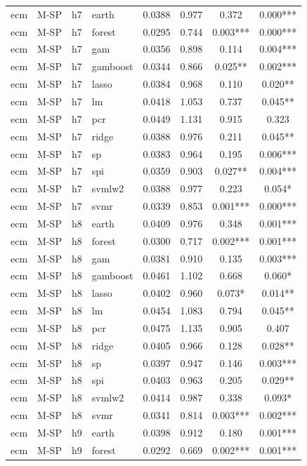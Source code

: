 \begin{ThreePartTable}
\begin{longtable}[t]{llclcccc}
\addlinespace
ecm & M-SP & h7 & earth & 0.0388 & 0.977 & 0.372 & 0.000***\\
ecm & M-SP & h7 & forest & 0.0295 & 0.744 & 0.003*** & 0.000***\\
ecm & M-SP & h7 & gam & 0.0356 & 0.898 & 0.114 & 0.004***\\
ecm & M-SP & h7 & gamboost & 0.0344 & 0.866 & 0.025** & 0.002***\\
ecm & M-SP & h7 & lasso & 0.0384 & 0.968 & 0.110 & 0.020**\\
ecm & M-SP & h7 & lm & 0.0418 & 1.053 & 0.737 & 0.045**\\
ecm & M-SP & h7 & pcr & 0.0449 & 1.131 & 0.915 & 0.323\\
ecm & M-SP & h7 & ridge & 0.0388 & 0.976 & 0.211 & 0.045**\\
ecm & M-SP & h7 & sp & 0.0383 & 0.964 & 0.195 & 0.006***\\
ecm & M-SP & h7 & spi & 0.0359 & 0.903 & 0.027** & 0.004***\\
ecm & M-SP & h7 & svmlw2 & 0.0388 & 0.977 & 0.223 & 0.054*\\
ecm & M-SP & h7 & svmr & 0.0339 & 0.853 & 0.001*** & 0.000***\\
\addlinespace
ecm & M-SP & h8 & earth & 0.0409 & 0.976 & 0.348 & 0.001***\\
ecm & M-SP & h8 & forest & 0.0300 & 0.717 & 0.002*** & 0.001***\\
ecm & M-SP & h8 & gam & 0.0381 & 0.910 & 0.135 & 0.003***\\
ecm & M-SP & h8 & gamboost & 0.0461 & 1.102 & 0.668 & 0.060*\\
ecm & M-SP & h8 & lasso & 0.0402 & 0.960 & 0.073* & 0.014**\\
ecm & M-SP & h8 & lm & 0.0454 & 1.083 & 0.794 & 0.045**\\
ecm & M-SP & h8 & pcr & 0.0475 & 1.135 & 0.905 & 0.407\\
ecm & M-SP & h8 & ridge & 0.0405 & 0.966 & 0.128 & 0.028**\\
ecm & M-SP & h8 & sp & 0.0397 & 0.947 & 0.146 & 0.003***\\
ecm & M-SP & h8 & spi & 0.0403 & 0.963 & 0.205 & 0.029**\\
ecm & M-SP & h8 & svmlw2 & 0.0414 & 0.987 & 0.338 & 0.093*\\
ecm & M-SP & h8 & svmr & 0.0341 & 0.814 & 0.003*** & 0.002***\\
\addlinespace
ecm & M-SP & h9 & earth & 0.0398 & 0.912 & 0.180 & 0.001***\\
ecm & M-SP & h9 & forest & 0.0292 & 0.669 & 0.002*** & 0.001***\\

\end{longtable}
\end{ThreePartTable}
